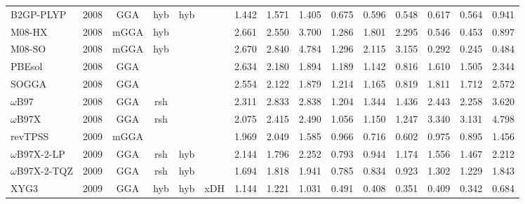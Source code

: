 \begin{landscape}
\begin{longtable}{lc:cccc:rrr:rrr:rrr}
    B2GP-PLYP        & 2008 & GGA  & hyb      & hyb         &           & 1.442             & 1.571             & 1.405  & 0.675              & 0.596             & 0.548  & 0.617   & 0.564 & 0.941 \\
    M08-HX           & 2008 & mGGA & hyb      &             &           & 2.661             & 2.550             & 3.700  & 1.286              & 1.801             & 2.295  & 0.546   & 0.453 & 0.897 \\
    M08-SO           & 2008 & mGGA & hyb      &             &           & 2.670             & 2.840             & 4.784  & 1.296              & 2.115             & 3.155  & 0.292   & 0.245 & 0.484 \\
    PBEsol           & 2008 & GGA  &          &             &           & 2.634             & 2.180             & 1.894  & 1.189              & 1.142             & 0.816  & 1.610   & 1.505 & 2.344 \\
    SOGGA            & 2008 & GGA  &          &             &           & 2.554             & 2.122             & 1.879  & 1.214              & 1.165             & 0.819  & 1.811   & 1.712 & 2.572 \\
    $\omega$B97             & 2008 & GGA  & rsh      &             &           & 2.311             & 2.833             & 2.838  & 1.204              & 1.344             & 1.436  & 2.443   & 2.258 & 3.620 \\
    $\omega$B97X            & 2008 & GGA  & rsh      &             &           & 2.075             & 2.415             & 2.490  & 1.056              & 1.150             & 1.247  & 3.340   & 3.131 & 4.798 \\
    revTPSS          & 2009 & mGGA &          &             &           & 1.969             & 2.049             & 1.585  & 0.966              & 0.716             & 0.602  & 0.975   & 0.895 & 1.456 \\
    $\omega$B97X-2-LP       & 2009 & GGA  & rsh      & hyb         &           & 2.144             & 1.796             & 2.252  & 0.793              & 0.944             & 1.174  & 1.556   & 1.467 & 2.212 \\
    $\omega$B97X-2-TQZ      & 2009 & GGA  & rsh      & hyb         &           & 1.694             & 1.818             & 1.941  & 0.785              & 0.834             & 0.923  & 1.302   & 1.229 & 1.843 \\
    XYG3             & 2009 & GGA  & hyb      & hyb         & xDH       & 1.144             & 1.221             & 1.031  & 0.491              & 0.408             & 0.351  & 0.409   & 0.342 & 0.684 \\

\end{longtable}
\end{landscape}
